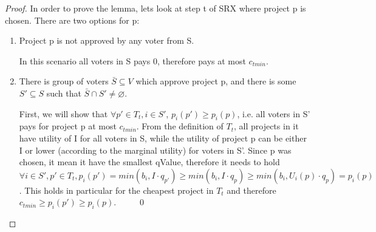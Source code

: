 \documentclass[runningheads]{llncs}
\begin{document}
\begin{proof}
In order to prove the lemma, lets look at step t of SRX where project p is chosen. There are two options for p:

\begin{enumerate}
    \item Project p is not approved by any voter from S.
    
    In this scenario all voters in S pays 0, therefore pays at most $c_{tmin}$.
    
    \item There is group of voters $\bar{S} \subseteq V$ which approve project p, and there is some $S'\subseteq S$ such that $\bar{S} \cap S'\neq \varnothing$.
    
    First, we will show that $\forall p'\in T_t, i\in S'$, $p_i(p')\geq p_i(p)$, i.e. all voters in S' pays for project p at most $c_{tmin}$.
    From the definition of $T_t$, all projects in it have utility of I for all voters in S, while the utility of project p can be either I or lower (according to the marginal utility) for voters in S'. Since p was chosen, it mean it have the smallest qValue, therefore it needs to hold $\forall i\in S', p'\in T_t, p_i(p')=min(b_i,I \cdot q_{p'})\geq min(b_i,I \cdot q_p)\geq min(b_i,U_i(p) \cdot q_p)=p_i(p)$. This holds in particular for the cheapest project in $T_t$ and therefore $c_{tmin}\geq p_i(p')\geq p_i(p)$.~~~~~\qed
\end{enumerate}
\end{proof}
\end{document}
